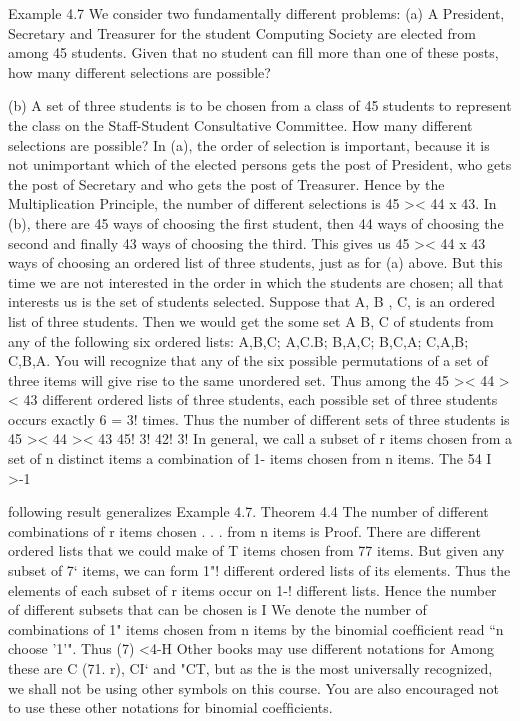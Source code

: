 \documentclass{beamer}
\begin{document}
\begin{frame}
Example 4.7 We consider two fundamentally different problems:
(a) A President, Secretary and Treasurer for the student Computing
Society are elected from among 45 students. Given that no
student can ﬁll more than one of these posts, how many
different selections are possible?
\end{frame}
\begin{frame}
(b) A set of three students is to be chosen from a class of 45
students to represent the class on the Staff-Student Consultative
Committee. How many different selections are possible?
In (a), the order of selection is important, because it is not
unimportant which of the elected persons gets the post of President,
who gets the post of Secretary and who gets the post of Treasurer.
Hence by the Multiplication Principle, the number of different
selections is 45 >< 44 x 43.
In (b), there are 45 ways of choosing the ﬁrst student, then 44 ways
of choosing the second and ﬁnally 43 ways of choosing the third.
This gives us 45 >< 44 x 43 ways of choosing an ordered list of three
students, just as for (a) above. But this time we are not interested in
the order in which the students are chosen; all that interests us is
the set of students selected. Suppose that A, B , C, is an ordered list
of three students. Then we would get the some set {A B, C} of
students from any of the following six ordered lists:
A,B,C; A,C.B; B,A,C; B,C,A; C,A,B; C,B,A.
You will recognize that any of the six possible permutations of a set
of three items will give rise to the same unordered set. Thus among
the 45 >< 44 >< 43 different ordered lists of three students, each
possible set of three students occurs exactly 6 = 3! times. Thus the
number of different sets of three students is
45 >< 44 >< 43 45!
3! 42! 3!
In general, we call a subset of r items chosen from a set of n distinct
items a combination of 1- items chosen from n items. The
54
I\)
>-1



following result generalizes Example 4.7.
Theorem 4.4 The number of different combinations of r items chosen
. . .
from n items is 
Proof. There are  different ordered lists that we could make of
T items chosen from 77 items. But given any subset of 7‘ items, we can
form 1"! different ordered lists of its elements. Thus the elements of
each subset of r items occur on 1-! different lists. Hence the number
of different subsets that can be chosen is  I
We denote the number of combinations of 1" items chosen from n
items by the binomial coefﬁcient  read “n choose '1'". Thus
(7)  <4-H
Other books may use different notations for  Among these are
C (71. r), CI‘ and "CT, but as the  is the most universally
recognized, we shall not be using other symbols on this course. You
are also encouraged not to use these other notations for binomial
coefﬁcients.
\end{frame}
\end{document}
